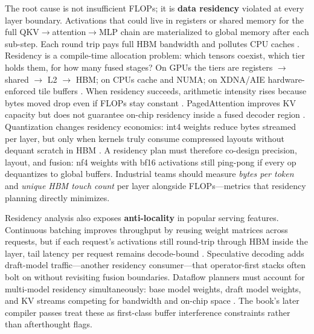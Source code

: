 The root cause is not insufficient FLOPs; it is \textbf{data residency} violated at every layer boundary.
Activations that could live in registers or shared memory for the full QKV$\rightarrow$attention$\rightarrow$MLP chain are materialized to global memory after each sub-step.
Each round trip pays full HBM bandwidth and pollutes CPU caches \citep{memoryfloor2026,patel2025llminference}.
Residency is a compile-time allocation problem: which tensors coexist, which tier holds them, for how many fused stages?
On GPUs the tiers are registers $\rightarrow$ shared $\rightarrow$ L2 $\rightarrow$ HBM; on CPUs cache and NUMA; on XDNA/AIE hardware-enforced tile buffers \citep{nvidia2022hopper,amd2024xdna,amd2024aie}.
When residency succeeds, arithmetic intensity rises because bytes moved drop even if FLOPs stay constant \citep{patel2025llminference}.
PagedAttention improves KV capacity but does not guarantee on-chip residency inside a fused decoder region \citep{kwon2023vllm}.
Quantization changes residency economics: int4 weights reduce bytes streamed per layer, but only when kernels truly consume compressed layouts without dequant scratch in HBM \citep{memoryfloor2026}.
A residency plan must therefore co-design precision, layout, and fusion: nf4 weights with bf16 activations still ping-pong if every op dequantizes to global buffers.
Industrial teams should measure \emph{bytes per token} and \emph{unique HBM touch count} per layer alongside FLOPs---metrics that residency planning directly minimizes.

Residency analysis also exposes \textbf{anti-locality} in popular serving features.
Continuous batching improves throughput by reusing weight matrices across requests, but if each request's activations still round-trip through HBM inside the layer, tail latency per request remains decode-bound \citep{kwon2023vllm}.
Speculative decoding adds draft-model traffic---another residency consumer---that operator-first stacks often bolt on without revisiting fusion boundaries.
Dataflow planners must account for multi-model residency simultaneously: base model weights, draft model weights, and KV streams competing for bandwidth and on-chip space \citep{patel2025llminference}.
The book's later compiler passes treat these as first-class buffer interference constraints rather than afterthought flags.

